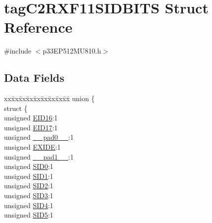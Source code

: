 \hypertarget{structtag_c2_r_x_f11_s_i_d_b_i_t_s}{}\section{tag\+C2\+R\+X\+F11\+S\+I\+D\+B\+I\+TS Struct Reference}
\label{structtag_c2_r_x_f11_s_i_d_b_i_t_s}


{\ttfamily \#include $<$p33\+E\+P512\+M\+U810.\+h$>$}

\subsection*{Data Fields}
\begin{DoxyCompactItemize}
\item 
\begin{tabbing}
xx\=xx\=xx\=xx\=xx\=xx\=xx\=xx\=xx\=\kill
union \{\\
\>struct \{\\
\>\>unsigned \hyperlink{structtag_c2_r_x_f11_s_i_d_b_i_t_s_a6dd5663b0c9838c56db040560ca0efa1}{EID16}:1\\
\>\>unsigned \hyperlink{structtag_c2_r_x_f11_s_i_d_b_i_t_s_aa648615464b0eb29967529333eee9fd9}{EID17}:1\\
\>\>unsigned \hyperlink{structtag_c2_r_x_f11_s_i_d_b_i_t_s_adf71f3d8410c1f1dbbc96680a92c49af}{\_\_pad0\_\_}:1\\
\>\>unsigned \hyperlink{structtag_c2_r_x_f11_s_i_d_b_i_t_s_a09ff1c1be3927220bd3dfbc10edfe243}{EXIDE}:1\\
\>\>unsigned \hyperlink{structtag_c2_r_x_f11_s_i_d_b_i_t_s_acaf2d0924a107ec6e8d2e31febaf66f9}{\_\_pad1\_\_}:1\\
\>\>unsigned \hyperlink{structtag_c2_r_x_f11_s_i_d_b_i_t_s_a1ca276ac15df60e1f7b9a6d0011ade93}{SID0}:1\\
\>\>unsigned \hyperlink{structtag_c2_r_x_f11_s_i_d_b_i_t_s_a3405d354f81391f879648f69f504dfc8}{SID1}:1\\
\>\>unsigned \hyperlink{structtag_c2_r_x_f11_s_i_d_b_i_t_s_ad744966dfc49307f731b7045b01b94e5}{SID2}:1\\
\>\>unsigned \hyperlink{structtag_c2_r_x_f11_s_i_d_b_i_t_s_a9345f3e64720be93e83d8dfc827f3f45}{SID3}:1\\
\>\>unsigned \hyperlink{structtag_c2_r_x_f11_s_i_d_b_i_t_s_aefb106fed4bb40e2c3c71ac612c554e3}{SID4}:1\\
\>\>unsigned \hyperlink{structtag_c2_r_x_f11_s_i_d_b_i_t_s_a0f221b3c9612231686bf87ccdcec8489}{SID5}:1\\

\end{tabbing}
\end{DoxyCompactItemize}
